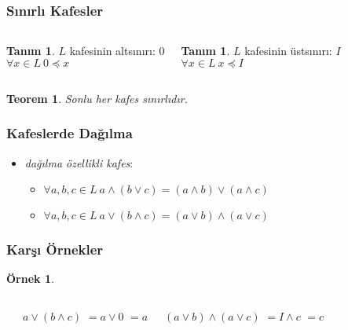 \documentclass[dvipsnames]{beamer}
\theoremstyle{definition}
\newtheorem{tanim}[theorem]{Tanım}
\theoremstyle{example}
\newtheorem{ornek}[theorem]{Örnek}
\theoremstyle{plain}
\newtheorem{teorem}[theorem]{Teorem}
\begin{document}
\begin{frame}
  \frametitle{Sınırlı Kafesler}

  \begin{columns}[t]
    \begin{tanim}
      $L$ kafesinin altsınırı: $0$\\
      $\forall x \in L~0 \preceq x$
    \end{tanim}

    \pause
    \begin{tanim}
      $L$ kafesinin üstsınırı: $I$\\
      $\forall x \in L~x \preceq I$
    \end{tanim}
  \end{columns}

  \pause
  \bigskip
  \begin{teorem}
    Sonlu her kafes sınırlıdır.
  \end{teorem}
\end{frame}

\begin{frame}
  \frametitle{Kafeslerde Dağılma}

  \begin{itemize}
    \item \emph{dağılma özellikli kafes}:
    \begin{itemize}
      \item $\forall a,b,c \in L~a \wedge (b \vee c) = (a \wedge b) \vee (a \wedge c)$
      \item $\forall a,b,c \in L~a \vee (b \wedge c) = (a \vee b) \wedge (a \vee c)$
    \end{itemize}
  \end{itemize}
\end{frame}

\begin{frame}
  \frametitle{Karşı Örnekler}

  \begin{ornek}
    \begin{columns}
      \begin{center}
      \end{center}

      \pause
      $a \vee (b \wedge c)$ \pause $= a \vee 0$ \pause $= a$

      \pause
      $(a \vee b) \wedge (a \vee c)$ \pause $= I \wedge c$ \pause $= c$
    \end{columns}
  \end{ornek}
\end{frame}
\end{document}
